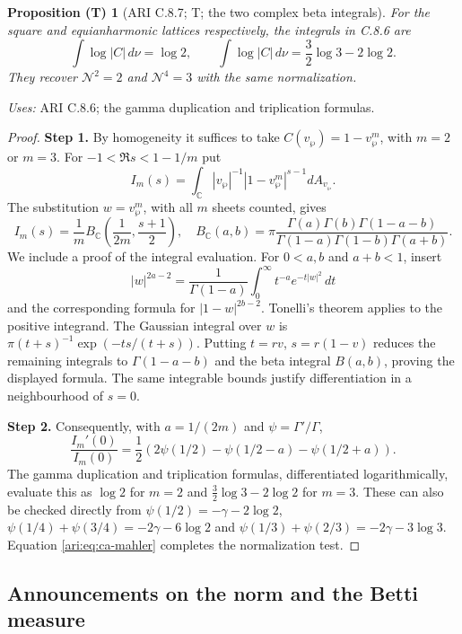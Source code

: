 \documentclass[11pt,a4paper]{article}
\theoremstyle{plain}
\newtheorem{proposition}[theorem]{Proposition (T)}
\theoremstyle{definition}
\newcommand{\C}{\mathbb C}
\begin{document}
\begin{proposition}[ARI C.8.7; T; the two complex beta integrals]\label{ari:C.8.7}
For the square and equianharmonic lattices respectively, the
integrals in C.8.6 are
\[
 \int\log|C|\,d\nu=\log2,\qquad
 \int\log|C|\,d\nu=\frac32\log3-2\log2.
\]
They recover $\mathcal N^2=2$ and $\mathcal N^4=3$ with the same normalization.
\end{proposition}
\noindent\textit{Uses:} ARI C.8.6; the gamma duplication and triplication formulas.\par
\begin{proof}
\noindent\textbf{Step 1.} By homogeneity it suffices to take $C(v_{\wp})=1-v_{\wp}^m$, with $m=2$
or $m=3$. For $-1<\Re s<1-1/m$ put
\[
 I_m(s)=\int_{\C} |v_{\wp}|^{-1}|1-v_{\wp}^m|^{s-1}dA_{v_{\wp}}.
\]
The substitution $w=v_{\wp}^m$, with all $m$ sheets counted, gives
\[
 I_m(s)=\frac1m B_{\C}\left(\frac1{2m},\frac{s+1}2\right),
 \quad
 B_{\C}(a,b)=\pi\frac{\Gamma(a)\Gamma(b)\Gamma(1-a-b)}
                   {\Gamma(1-a)\Gamma(1-b)\Gamma(a+b)}.
\]
We include a proof of the integral evaluation. For
$0<a,b$ and $a+b<1$, insert
\[
 |w|^{2a-2}=\frac1{\Gamma(1-a)}
       \int_0^\infty t^{-a}e^{-t|w|^2}\,dt
\]
and the corresponding formula for $|1-w|^{2b-2}$.
Tonelli's theorem applies to the positive integrand. The
Gaussian integral over $w$ is
$\pi(t+s)^{-1}\exp(-ts/(t+s))$.
Putting $t=rv$, $s=r(1-v)$ reduces the remaining integrals
to $\Gamma(1-a-b)$ and the beta integral $B(a,b)$, proving
the displayed formula. The same integrable bounds justify
differentiation in a neighbourhood of $s=0$.


\noindent\textbf{Step 2.} Consequently, with $a=1/(2m)$ and $\psi=\Gamma'/\Gamma$,
\[
 \frac{I_m'(0)}{I_m(0)}
 =\frac12\left(2\psi(1/2)-\psi(1/2-a)-\psi(1/2+a)\right).
\]
The gamma duplication and triplication formulas, differentiated
logarithmically, evaluate this as $\log2$ for $m=2$ and
$\frac32\log3-2\log2$ for $m=3$. These can also be checked
directly from
$\psi(1/2)=-\gamma-2\log2$,
$\psi(1/4)+\psi(3/4)=-2\gamma-6\log2$ and
$\psi(1/3)+\psi(2/3)=-2\gamma-3\log3$.
Equation \eqref{ari:eq:ca-mahler} completes the normalization test.
\end{proof}

\subsection{Announcements on the norm and the Betti measure}
\end{document}
